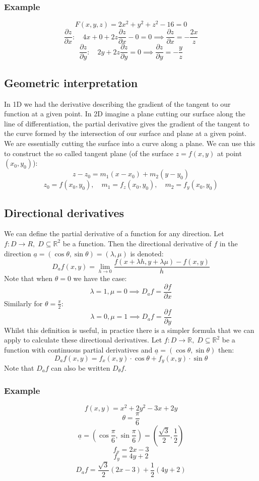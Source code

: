 \documentclass[12pt]{article}
\newcommand{\pf}[2]{\frac{\partial #1}{\partial #2}}
\begin{document}
\subsubsection*{Example}
\[F(x,y,z)=2x^2+y^2+z^2-16=0\]
\[\pf{z}{x}:\quad 4x+0+2z\pf{z}{x}-0=0\implies \pf{z}{x}=-\frac{2x}{z}\]
\[\pf{z}{y}:\quad 2y+2z\pf{z}{y}=0\implies \pf{z}{y}=-\frac{y}{z}\]
\subsection*{Geometric interpretation}
In 1D we had the derivative describing the gradient of the tangent to our function at a given point. In 2D imagine a plane cutting our surface along the line of differentiation, the partial derivative gives the gradient of the tangent to the curve formed by the intersection of our surface and plane at a given point. We are essentially cutting the surface into a curve along a plane. We can use this to construct the so called tangent plane (of the surface \(z=f(x,y)\) at point \((x_0,y_0)\)):
\[z-z_0=m_1(x-x_0)+m_2(y-y_0)\]
\[z_0=f(x_0,y_0),\quad m_1=f_z(x_0,y_0),\quad m_2=f_y(x_0,y_0)\]
\subsection*{Directional derivatives}
We can define the partial derivative of a function for any direction. Let \(f:D\to R,\;D\subseteq\mathbb{R}^2\) be a function. Then the directional derivative of \(f\) in the direction \(\underline{a}=(\cos{\theta},\sin{\theta})=(\lambda,\mu)\) is denoted:
\[D_af(x,y)=\lim_{h\to 0}\frac{f(x+\lambda h, y+\lambda \mu)-f(x,y)}{h}\]
Note that when \(\theta=0\) we have the case:
\[\lambda=1,\mu=0\implies D_af=\pf{f}{x}\]
Similarly for \(\theta=\frac{\pi}{2}\):
\[\lambda=0,\mu=1\implies D_af=\pf{f}{y}\]
Whilst this definition is useful, in practice there is a simpler formula that we can apply to calculate these directional derivatives. Let \(f:D\to\mathbb{R},\;D\subseteq\mathbb{R}^2\) be a function with continuous partial derivatives and \(\underline{a}=(\cos{\theta},\sin{\theta})\) then:
\[D_af(x,y)=f_x(x,y)\cdot\cos{\theta}+f_y(x,y)\cdot\sin{\theta}\]
Note that \(D_a f\) can also be written \(D_\theta f\).
\subsubsection*{Example}
\[f(x,y)=x^2+2y^2-3x+2y\]
\[\theta=\frac{\pi}{6}\]
\[\underline{a}=(\cos{\frac{\pi}{6}},\sin{\frac{\pi}{6}})=(\frac{\sqrt{3}}{2},\frac{1}{2})\]
\[f_x=2x-3\]
\[f_y=4y+2\]
\[D_af=\frac{\sqrt{3}}{2}(2x-3)+\frac{1}{2}(4y+2)\]
\end{document}
